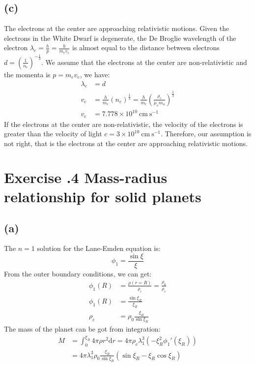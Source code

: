 \documentclass[a4paper,12pt]{article}
\renewcommand{\d}{\mathrm{d}}
\newcommand{\cm}{\mathrm{cm}}
\newcommand{\s}{\mathrm{s}}
\begin{document}
\subsection*{(c)}
The electrons at the center are approaching relativistic motions. 
Given the electrons in the White Dwarf is degenerate, 
the De Broglie wavelength of the electron $\lambda_e = \frac{h}{p} = \frac{h}{m_e v_e}$
is almost equal to the distance between electrons $d = (\frac{1}{n_e})^{-\frac{1}{3}}$. 
We assume that the electrons at the center are non-relativistic and the momenta is 
$p = m_e v_e$, we have:
\begin{align*}
    \lambda_e &= d \\
    v_e &= \frac{h}{m_e} (n_e)^{\frac{1}{3}} = \frac{h}{m_e} (\frac{\rho_c}{\mu_e m_u})^{\frac{1}{3}} \\
    v_e &= 7.778\times 10^{10} \ \cm \ \s^{-1}
\end{align*}
If the electrons at the center are non-relativistic, the velocity of the electrons is greater than 
the velocity of light $c=3\times 10^{10}\ \cm \ \s^{-1} $.
Therefore, our assumption is not right, that is the electrons at the center are approaching relativistic motions.

\section*{\textbf{Exercise \uppercase\expandafter{}.4 Mass-radius relationship for solid planets}}
\subsection*{(a)}
The $n=1$ solution for the Lane-Emden equation is:
\begin{equation*}
    \phi_1 = \frac{\sin \xi}{\xi}
\end{equation*}
From the outer boundary conditions, we can get:
\begin{align*}
    \phi_1(R) &= \frac{\rho(r=R)}{\rho_c} = \frac{\rho_0}{\rho_c} \\
    \phi_1(R) &= \frac{\sin \xi_R}{\xi_R} \\
    \rho_c &= \rho_0 \frac{\xi_R}{\sin \xi_R}
\end{align*}
The mass of the planet can be got from integration:
\begin{align*}
    M &= \int_{0}^{\xi_R} 4\pi \rho r^2 \d r = 4\pi \rho_c \lambda_1^3 (-\xi_R^2 \phi_1'(\xi_R)) \\
    &= 4\pi \lambda_1^3 \rho_0 \frac{\xi_R}{\sin \xi_R} (\sin \xi_R - \xi_R\cos \xi_R)
\end{align*}
\end{document}
